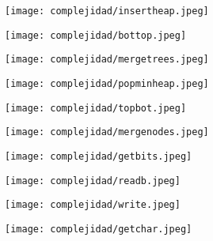\documentclass[12 pt]{report}
\begin{document}
\begin{figure}[h!]
  \centering
  \texttt{[image: complejidad/insertheap.jpeg]}
  \caption{\label{fig:Insercion en la cola de prioridad} }
\end{figure}
\newpage
\begin{figure}[h!]
  \centering
  \texttt{[image: complejidad/bottop.jpeg]}
  \caption{\label{fig:Hacer bottom top al montículo} }
\end{figure}
\begin{figure}[h!]
  \centering
  \texttt{[image: complejidad/mergetrees.jpeg]}
  \caption{\label{fig:Unir todos los arboles en uno principal} }
\end{figure}
\begin{figure}[h!]
  \centering
  \texttt{[image: complejidad/popminheap.jpeg]}
  \caption{\label{fig:Eliminar y devolver el menor elemento de la cola} }
\end{figure}
\newpage
\begin{figure}[h!]
  \centering
  \texttt{[image: complejidad/topbot.jpeg]}
  \caption{\label{fig:Hacer top bottom al montículo} }
\end{figure}
\begin{figure}[h!]
  \centering
  \texttt{[image: complejidad/mergenodes.jpeg]}
  \caption{\label{fig:Unir dos nodos a un ancestro comun} }
\end{figure}
\newpage
\begin{figure}[h!]
  \centering
  \texttt{[image: complejidad/getbits.jpeg]}
  \caption{\label{fig:Obtener la codificación correspondiente} }
\end{figure}
\begin{figure}[h!]
  \centering
  \texttt{[image: complejidad/readb.jpeg]}
  \caption{\label{fig:Leer el achivo comprimido} }
\end{figure}
\newpage
\begin{figure}[h!]
  \centering
  \texttt{[image: complejidad/write.jpeg]}
  \caption{\label{fig:Escribir el archivo original decodificando} }
\end{figure}
\begin{figure}[h!]
  \centering
  \texttt{[image: complejidad/getchar.jpeg]}
  \caption{\label{fig:Obtener el byte decodificado dada una cadena de bits} }
\end{figure}
\newpage
\end{document}
